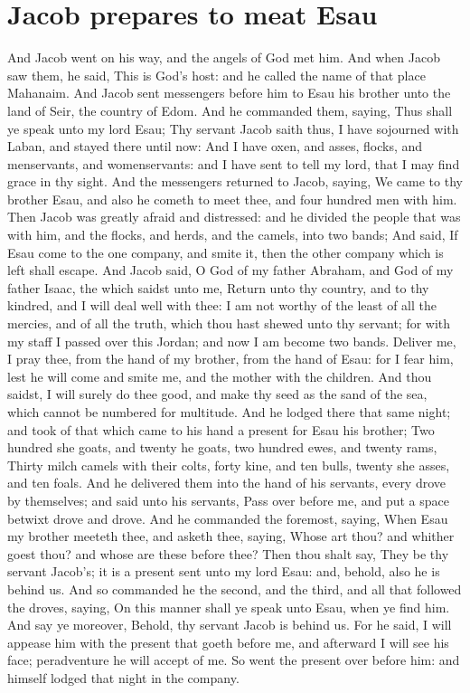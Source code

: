 \section*{Jacob prepares to meat Esau}
\begin{biblechapter} %
\verse And Jacob went on his way, and the angels of God met him.
\verse And when Jacob saw them, he said, This is God's host: and he called the name of that place Mahanaim.
\verse And Jacob sent messengers before him to Esau his brother unto the land of Seir, the country of Edom.
\verse And he commanded them, saying, Thus shall ye speak unto my lord Esau; Thy servant Jacob saith thus, I have sojourned with Laban, and stayed there until now:
\verse And I have oxen, and asses, flocks, and menservants, and womenservants: and I have sent to tell my lord, that I may find grace in thy sight.
\verse And the messengers returned to Jacob, saying, We came to thy brother Esau, and also he cometh to meet thee, and four hundred men with him.
\verse Then Jacob was greatly afraid and distressed: and he divided the people that was with him, and the flocks, and herds, and the camels, into two bands;
\verse And said, If Esau come to the one company, and smite it, then the other company which is left shall escape.
\verse And Jacob said, O God of my father Abraham, and God of my father Isaac, the \LORD which saidst unto me, Return unto thy country, and to thy kindred, and I will deal well with thee:
\verse I am not worthy of the least of all the mercies, and of all the truth, which thou hast shewed unto thy servant; for with my staff I passed over this Jordan; and now I am become two bands.
\verse Deliver me, I pray thee, from the hand of my brother, from the hand of Esau: for I fear him, lest he will come and smite me, and the mother with the children.
\verse And thou saidst, I will surely do thee good, and make thy seed as the sand of the sea, which cannot be numbered for multitude.
\verse And he lodged there that same night; and took of that which came to his hand a present for Esau his brother;
\verse Two hundred she goats, and twenty he goats, two hundred ewes, and twenty rams,
\verse Thirty milch camels with their colts, forty kine, and ten bulls, twenty she asses, and ten foals.
\verse And he delivered them into the hand of his servants, every drove by themselves; and said unto his servants, Pass over before me, and put a space betwixt drove and drove.
\verse And he commanded the foremost, saying, When Esau my brother meeteth thee, and asketh thee, saying, Whose art thou? and whither goest thou? and whose are these before thee?
\verse Then thou shalt say, They be thy servant Jacob's; it is a present sent unto my lord Esau: and, behold, also he is behind us.
\verse And so commanded he the second, and the third, and all that followed the droves, saying, On this manner shall ye speak unto Esau, when ye find him.
\verse And say ye moreover, Behold, thy servant Jacob is behind us. For he said, I will appease him with the present that goeth before me, and afterward I will see his face; peradventure he will accept of me.
\verse So went the present over before him: and himself lodged that night in the company.

\end{biblechapter}
